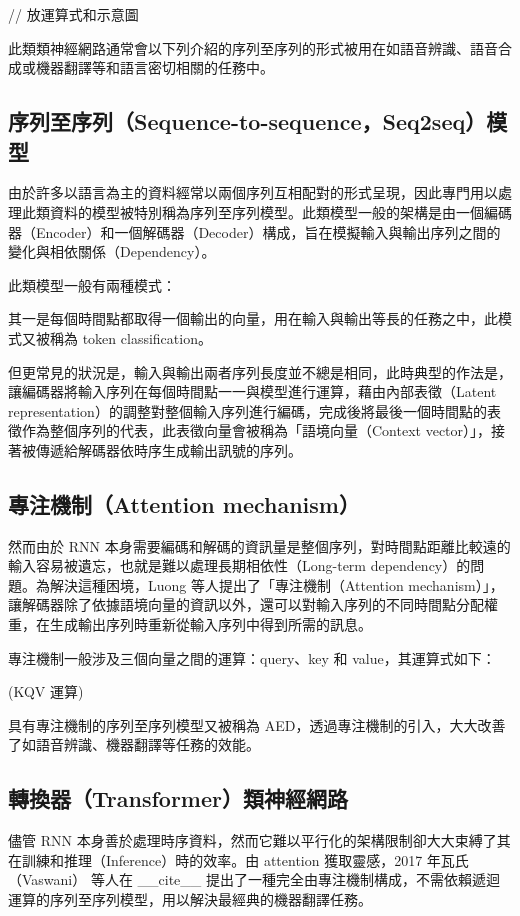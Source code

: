 // 放運算式和示意圖

此類類神經網路通常會以下列介紹的序列至序列的形式被用在如語音辨識、語音合成或機器翻譯等和語言密切相關的任務中。

\subsection{序列至序列（Sequence-to-sequence，Seq2seq）模型}

由於許多以語言為主的資料經常以兩個序列互相配對的形式呈現，因此專門用以處理此類資料的模型被特別稱為序列至序列模型。此類模型一般的架構是由一個編碼器（Encoder）和一個解碼器（Decoder）構成，旨在模擬輸入與輸出序列之間的變化與相依關係（Dependency）。

此類模型一般有兩種模式：

其一是每個時間點都取得一個輸出的向量，用在輸入與輸出等長的任務之中，此模式又被稱為 token classification。

但更常見的狀況是，輸入與輸出兩者序列長度並不總是相同，此時典型的作法是，讓編碼器將輸入序列在每個時間點一一與模型進行運算，藉由內部表徵（Latent representation）的調整對整個輸入序列進行編碼，完成後將最後一個時間點的表徵作為整個序列的代表，此表徵向量會被稱為「語境向量（Context vector）」，接著被傳遞給解碼器依時序生成輸出訊號的序列。

\subsection{專注機制（Attention mechanism）}

然而由於 RNN 本身需要編碼和解碼的資訊量是整個序列，對時間點距離比較遠的輸入容易被遺忘，也就是難以處理長期相依性（Long-term dependency）的問題。為解決這種困境，Luong 等人提出了「專注機制（Attention mechanism）」，讓解碼器除了依據語境向量的資訊以外，還可以對輸入序列的不同時間點分配權重，在生成輸出序列時重新從輸入序列中得到所需的訊息。

專注機制一般涉及三個向量之間的運算：query、key 和 value，其運算式如下：

(KQV 運算)

具有專注機制的序列至序列模型又被稱為 AED，透過專注機制的引入，大大改善了如語音辨識、機器翻譯等任務的效能。

\subsection{轉換器（Transformer）類神經網路}

儘管 RNN 本身善於處理時序資料，然而它難以平行化的架構限制卻大大束縛了其在訓練和推理（Inference）時的效率。由 attention 獲取靈感，2017 年瓦氏（Vaswani） 等人在 \_\_cite\_\_ 提出了一種完全由專注機制構成，不需依賴遞迴運算的序列至序列模型，用以解決最經典的機器翻譯任務。

